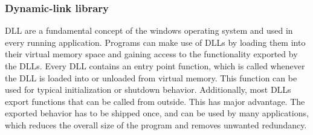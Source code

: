 \subsubsection{Dynamic-link library}
\gls{DLL} are a fundamental concept of the windows operating system and used in every running application. Programs can make use of \glspl{DLL} by loading them into their virtual memory space and gaining access to the functionality exported by the \glspl{DLL}. Every \gls{DLL} contains an entry point function, which is called whenever the \gls{DLL} is loaded into or unloaded from virtual memory. This function can be used for typical initialization or shutdown behavior. Additionally, most \glspl{DLL} export functions that can be called from outside. This has major advantage. The exported behavior has to be shipped once, and can be used by many applications, which reduces the overall size of the program and removes unwanted redundancy.